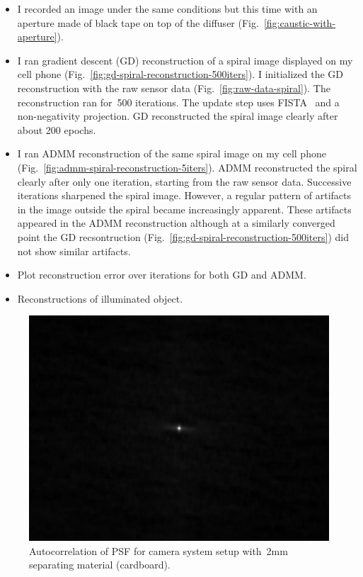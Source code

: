 \documentclass[final]{cvpr}
\begin{document}
\begin{itemize}
	\item I recorded an image under the same conditions but this time with
	      an aperture made of black tape on top of the diffuser
	      (Fig.~\ref{fig:caustic-with-aperture}).

	\item I ran gradient descent (GD) reconstruction of a spiral image displayed
	      on my cell phone
	      (Fig.~\ref{fig:gd-spiral-reconstruction-500iters}).
	      I initialized the GD reconstruction with the raw sensor data
	      (Fig.~\ref{fig:raw-data-spiral}).
	      The reconstruction ran for~\num{500} iterations.
	      The update step uses FISTA~\cite{beck2009fast} and a
	      non-negativity projection.
	      GD reconstructed the spiral image clearly after about 200 epochs.

	\item I ran ADMM reconstruction of the same spiral image on my cell phone
	      (Fig.~\ref{fig:admm-spiral-reconstruction-5iters}).
	      ADMM reconstructed the spiral clearly after only one iteration,
	      starting from the raw sensor data.
	      Successive iterations sharpened the spiral image.
	      However, a regular pattern of artifacts in the image outside the
	      spiral became increasingly apparent.
	      These artifacts appeared in the ADMM reconstruction although at a
	      similarly converged point the GD recsontruction
	      (Fig.~\ref{fig:gd-spiral-reconstruction-500iters}) did not show
	      similar artifacts.

	\item Plot reconstruction error over iterations for both GD and ADMM\@.

	\item Reconstructions of illuminated object.
\end{itemize}


\begin{figure}[t]
	\centering
	\includegraphics[width=1.0\linewidth]{images/psf-autocorrelation-2mm-spacing}
	\caption{\label{fig:psf-autocorrelation-2mm-spacing}
		Autocorrelation of PSF for camera system setup with~\num{2}mm
		separating material (cardboard).}
\end{figure}
\end{document}
